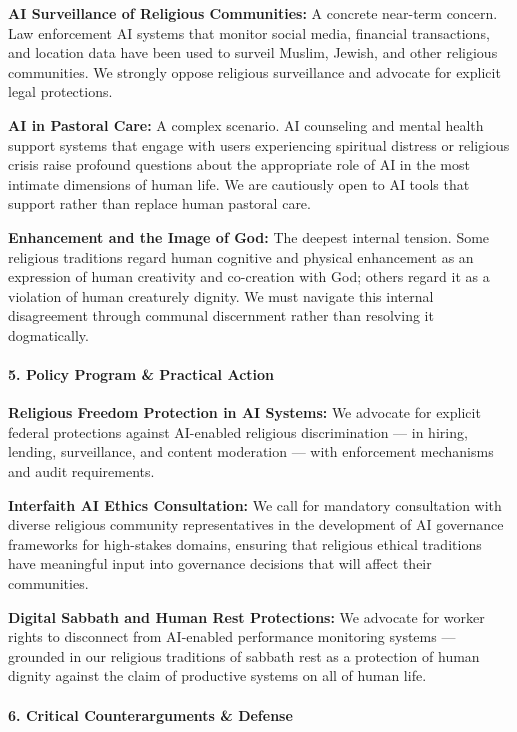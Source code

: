 \textbf{AI Surveillance of Religious Communities:} A concrete near-term
concern. Law enforcement AI systems that monitor social media, financial
transactions, and location data have been used to surveil Muslim,
Jewish, and other religious communities. We strongly oppose religious
surveillance and advocate for explicit legal protections.

\textbf{AI in Pastoral Care:} A complex scenario. AI counseling and
mental health support systems that engage with users experiencing
spiritual distress or religious crisis raise profound questions about
the appropriate role of AI in the most intimate dimensions of human
life. We are cautiously open to AI tools that support rather than
replace human pastoral care.

\textbf{Enhancement and the Image of God:} The deepest internal tension.
Some religious traditions regard human cognitive and physical
enhancement as an expression of human creativity and co-creation with
God; others regard it as a violation of human creaturely dignity. We
must navigate this internal disagreement through communal discernment
rather than resolving it dogmatically.

\paragraph{5. Policy Program \& Practical
Action}\label{policy-program-practical-action-35}

\textbf{Religious Freedom Protection in AI Systems:} We advocate for
explicit federal protections against AI-enabled religious discrimination
--- in hiring, lending, surveillance, and content moderation --- with
enforcement mechanisms and audit requirements.

\textbf{Interfaith AI Ethics Consultation:} We call for mandatory
consultation with diverse religious community representatives in the
development of AI governance frameworks for high-stakes domains,
ensuring that religious ethical traditions have meaningful input into
governance decisions that will affect their communities.

\textbf{Digital Sabbath and Human Rest Protections:} We advocate for
worker rights to disconnect from AI-enabled performance monitoring
systems --- grounded in our religious traditions of sabbath rest as a
protection of human dignity against the claim of productive systems on
all of human life.

\paragraph{6. Critical Counterarguments \&
Defense}\label{critical-counterarguments-defense-35}

